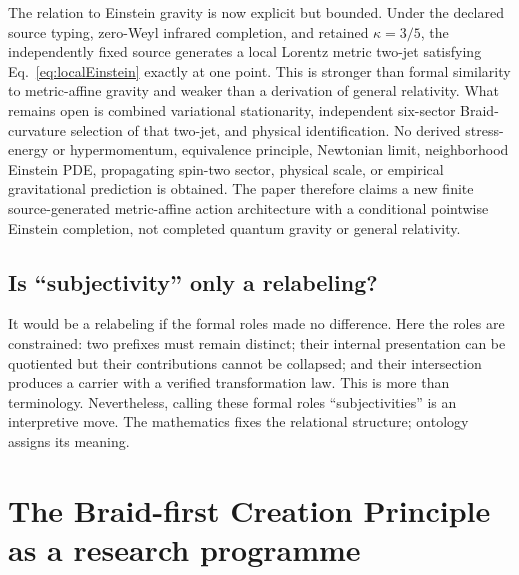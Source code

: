 \documentclass[11pt]{article}
\theoremstyle{definition}
\theoremstyle{remark}
\begin{document}
The relation to Einstein gravity is now explicit but bounded. Under the declared source typing, zero-Weyl infrared completion, and retained $\kappa=3/5$, the independently fixed source generates a local Lorentz metric two-jet satisfying Eq.~\eqref{eq:localEinstein} exactly at one point. This is stronger than formal similarity to metric-affine gravity and weaker than a derivation of general relativity. What remains open is combined variational stationarity, independent six-sector Braid-curvature selection of that two-jet, and physical identification. No derived stress-energy or hypermomentum, equivalence principle, Newtonian limit, neighborhood Einstein PDE, propagating spin-two sector, physical scale, or empirical gravitational prediction is obtained. The paper therefore claims a new finite source-generated metric-affine action architecture with a conditional pointwise Einstein completion, not completed quantum gravity or general relativity.

\subsection{Is ``subjectivity'' only a relabeling?}

It would be a relabeling if the formal roles made no difference. Here the roles are constrained: two prefixes must remain distinct; their internal presentation can be quotiented but their contributions cannot be collapsed; and their intersection produces a carrier with a verified transformation law. This is more than terminology. Nevertheless, calling these formal roles ``subjectivities'' is an interpretive move. The mathematics fixes the relational structure; ontology assigns its meaning.

\section{The Braid-first Creation Principle as a research programme}
\end{document}
